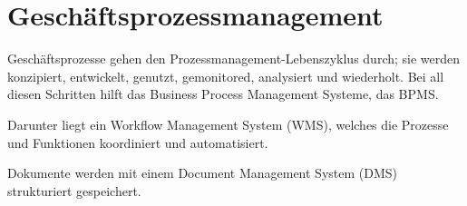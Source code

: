 \documentclass{article}
\begin{document}
\section{Geschäftsprozessmanagement}
Geschäftsprozesse gehen den Prozessmanagement-Lebenszyklus durch; sie werden konzipiert, entwickelt, genutzt, gemonitored, analysiert und wiederholt. Bei all diesen Schritten hilft das Business Process Management Systeme, das BPMS.

Darunter liegt ein Workflow Management System (WMS), welches die Prozesse und Funktionen koordiniert und automatisiert.

Dokumente werden mit einem Document Management System (DMS) strukturiert gespeichert.
\end{document}
